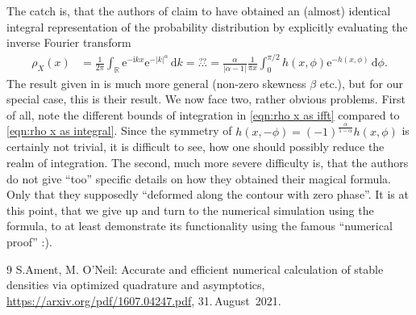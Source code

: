 \documentclass[english, parskip=full]{scrartcl}
\newcommand{\intx}{}
\renewcommand{\i}{\text{i}}
\newcommand{\e}{\text{e}}
\begin{document}
The catch is, that the authors of \cite{numerical levy stable distributions} claim to have obtained an (almost) identical integral representation of the probability distribution by explicitly evaluating the inverse Fourier transform
\begin{align}
\rho_X(x)&=\frac{1}{2\pi}\intx\int_{\mathbb{R}} \e^{-\i kx}\e^{-|k|^\alpha}\, \mathrm{d}k=\overset{??}{\dots}=\frac{\alpha}{|\alpha -1|}\frac{1}{\pi x}\intx\int_{0}^{\pi/2}h(x,\phi)\e^{-h(x,\phi)}\, \mathrm{d}\phi. \label{eqn:rho x as ifft}
\end{align}
The result given in \cite{numerical levy stable distributions} is much more general (non-zero skewness $\beta$ etc.), but for our special case, this is their result.
We now face two, rather obvious problems.
First of all, note the different bounds of integration in \eqref{eqn:rho x as ifft} compared to \eqref{eqn:rho x as integral}.
Since the symmetry of $h(x,-\phi)=(-1)^\frac{\alpha}{1-\alpha}h(x,\phi)$ is certainly not trivial, it is difficult to see, how one should possibly reduce the realm of integration. 
The second, much more severe difficulty is, that the authors do not give ``too'' specific details on how they obtained their magical formula. 
Only that they supposedly ``deformed along the contour with zero phase''.
It is at this point, that we give up and turn to the numerical simulation using the formula, to at least demonstrate its functionality using the famous ``numerical proof'' :).
\\

\begin{thebibliography}{9}
 S.Ament, M. O'Neil: Accurate and efficient numerical calculation of stable
densities via optimized quadrature and asymptotics, \url{https://arxiv.org/pdf/1607.04247.pdf}, 31.\,August~2021.
\end{thebibliography}
\end{document}
